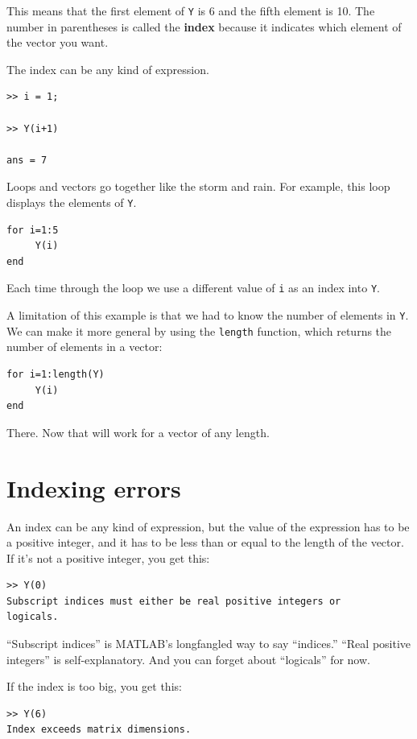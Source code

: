 \documentclass[
]{book}
\begin{document}
This means that the first element of {\tt Y} is 6 and the
fifth element is 10.  The number in parentheses is called
the {\bf index} because it indicates which element of the
vector you want.

The index can be any kind of expression.

\begin{verbatim}
>> i = 1;

>> Y(i+1)

ans = 7
\end{verbatim}

Loops and vectors go together like the storm and rain.
For example, this loop displays the elements of {\tt Y}.

\begin{verbatim}
for i=1:5
     Y(i)
end
\end{verbatim}

Each time through the loop we use a different value of {\tt i}
as an index into {\tt Y}.

A limitation of this example is that we had to know the number
of elements in {\tt Y}.  We can make it more general by using
the {\tt length} function, which returns the number of elements
in a vector:

\begin{verbatim}
for i=1:length(Y)
     Y(i)
end
\end{verbatim}

There.  Now that will work for a vector of any length.


\section{Indexing errors}

An index can be any kind of expression, but the value of the
expression has to be a positive integer, and it has to be
less than or equal to the length of the vector.  If it's
not a positive integer, you get this:

\begin{verbatim}
>> Y(0)
Subscript indices must either be real positive integers or
logicals.
\end{verbatim}

``Subscript indices'' is MATLAB's longfangled way to say ``indices.''
``Real positive integers''
is self-explanatory.
And you can forget about ``logicals'' for now.

If the index is too big, you get this:

\begin{verbatim}
>> Y(6)
Index exceeds matrix dimensions.
\end{verbatim}
\end{document}
